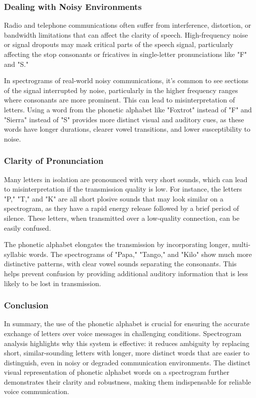 \subsubsection*{Dealing with Noisy Environments}
Radio and telephone communications often suffer from interference, distortion, or bandwidth limitations that can affect the clarity of speech. High-frequency noise or signal dropouts may mask critical parts of the speech signal, particularly affecting the stop consonants or fricatives in single-letter pronunciations like "F" and "S."

In spectrograms of real-world noisy communications, it's common to see sections of the signal interrupted by noise, particularly in the higher frequency ranges where consonants are more prominent. This can lead to misinterpretation of letters. Using a word from the phonetic alphabet like "Foxtrot" instead of "F" and "Sierra" instead of "S" provides more distinct visual and auditory cues, as these words have longer durations, clearer vowel transitions, and lower susceptibility to noise.

\subsubsection*{Clarity of Pronunciation}
Many letters in isolation are pronounced with very short sounds, which can lead to misinterpretation if the transmission quality is low. For instance, the letters "P," "T," and "K" are all short plosive sounds that may look similar on a spectrogram, as they have a rapid energy release followed by a brief period of silence. These letters, when transmitted over a low-quality connection, can be easily confused.

The phonetic alphabet elongates the transmission by incorporating longer, multi-syllabic words. The spectrograms of "Papa," "Tango," and "Kilo" show much more distinctive patterns, with clear vowel sounds separating the consonants. This helps prevent confusion by providing additional auditory information that is less likely to be lost in transmission.

\subsubsection*{Conclusion}
In summary, the use of the phonetic alphabet is crucial for ensuring the accurate exchange of letters over voice messages in challenging conditions. Spectrogram analysis highlights why this system is effective: it reduces ambiguity by replacing short, similar-sounding letters with longer, more distinct words that are easier to distinguish, even in noisy or degraded communication environments. The distinct visual representation of phonetic alphabet words on a spectrogram further demonstrates their clarity and robustness, making them indispensable for reliable voice communication.

\newpage